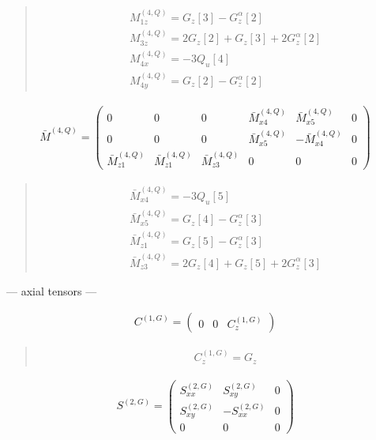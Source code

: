 \documentclass[fleqn,10pt]{jsarticle}
\begin{document}
\begin{quote}
\begin{align*}
& M^{(4,Q)}_{1z} = G_{z}[3] - G_{z}^{\alpha}[2] \\
& M^{(4,Q)}_{3z} = 2 G_{z}[2] + G_{z}[3] + 2 G_{z}^{\alpha}[2] \\
& M^{(4,Q)}_{4x} = - 3 Q_{u}[4] \\
& M^{(4,Q)}_{4y} = G_{z}[2] - G_{z}^{\alpha}[2]
\end{align*}
\end{quote}
\begin{align*}
\bar{M}^{(4,Q)} = \begin{pmatrix} 0 & 0 & 0 & \bar{M}^{(4,Q)}_{x4} & \bar{M}^{(4,Q)}_{x5} & 0 \\ 0 & 0 & 0 & \bar{M}^{(4,Q)}_{x5} & - \bar{M}^{(4,Q)}_{x4} & 0 \\ \bar{M}^{(4,Q)}_{z1} & \bar{M}^{(4,Q)}_{z1} & \bar{M}^{(4,Q)}_{z3} & 0 & 0 & 0 \end{pmatrix}
\end{align*}
\begin{quote}
\begin{align*}
& \bar{M}^{(4,Q)}_{x4} = - 3 Q_{u}[5] \\
& \bar{M}^{(4,Q)}_{x5} = G_{z}[4] - G_{z}^{\alpha}[3] \\
& \bar{M}^{(4,Q)}_{z1} = G_{z}[5] - G_{z}^{\alpha}[3] \\
& \bar{M}^{(4,Q)}_{z3} = 2 G_{z}[4] + G_{z}[5] + 2 G_{z}^{\alpha}[3]
\end{align*}
\end{quote}
\newpage
\begin{center}\LARGE --- axial tensors ---\end{center}
\begin{align*}
C^{(1,G)} = \begin{pmatrix} 0 & 0 & C^{(1,G)}_{z} \end{pmatrix}
\end{align*}
\begin{quote}
\begin{align*}
& C^{(1,G)}_{z} = G_{z}
\end{align*}
\end{quote}
\begin{align*}
S^{(2,G)} = \begin{pmatrix} S^{(2,G)}_{xx} & S^{(2,G)}_{xy} & 0 \\ S^{(2,G)}_{xy} & - S^{(2,G)}_{xx} & 0 \\ 0 & 0 & 0 \end{pmatrix}
\end{align*}
\end{document}

